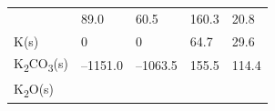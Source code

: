\documentclass[
  9pt,
]{extbook}
\theoremstyle{definition}
\theoremstyle{definition}
\theoremstyle{definition}
\theoremstyle{remark}
\begin{document}
\begin{longtable}[]{@{}lllll@{}}
\begin{minipage}[t]{0.10\columnwidth}
\end{minipage} & \begin{minipage}[t]{0.19\columnwidth}\raggedright
89.0\strut
\end{minipage} & \begin{minipage}[t]{0.20\columnwidth}\raggedright
60.5\strut
\end{minipage} & \begin{minipage}[t]{0.18\columnwidth}\raggedright
160.3\strut
\end{minipage} & \begin{minipage}[t]{0.18\columnwidth}\raggedright
20.8\strut
\end{minipage}\tabularnewline
\begin{minipage}[t]{0.10\columnwidth}\raggedright
K(s)\strut
\end{minipage} & \begin{minipage}[t]{0.19\columnwidth}\raggedright
0\strut
\end{minipage} & \begin{minipage}[t]{0.20\columnwidth}\raggedright
0\strut
\end{minipage} & \begin{minipage}[t]{0.18\columnwidth}\raggedright
64.7\strut
\end{minipage} & \begin{minipage}[t]{0.18\columnwidth}\raggedright
29.6\strut
\end{minipage}\tabularnewline
\begin{minipage}[t]{0.10\columnwidth}\raggedright
K\textsubscript{2}CO\textsubscript{3}(s)\strut
\end{minipage} & \begin{minipage}[t]{0.19\columnwidth}\raggedright
--1151.0\strut
\end{minipage} & \begin{minipage}[t]{0.20\columnwidth}\raggedright
--1063.5\strut
\end{minipage} & \begin{minipage}[t]{0.18\columnwidth}\raggedright
155.5\strut
\end{minipage} & \begin{minipage}[t]{0.18\columnwidth}\raggedright
114.4\strut
\end{minipage}\tabularnewline
\begin{minipage}[t]{0.10\columnwidth}\raggedright
K\textsubscript{2}O(s)\strut
\end{minipage} & \begin{minipage}[t]{0.19\columnwidth}\raggedright

\end{minipage}
\end{longtable}
\end{document}
